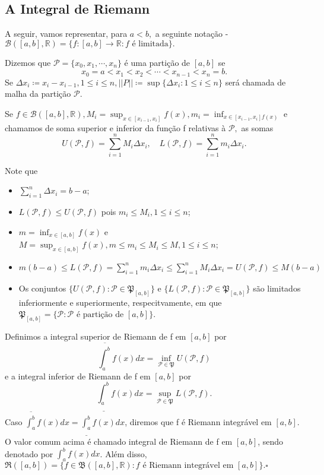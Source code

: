 \documentclass[Analysis/analysis_notes.tex]{subfiles}
\begin{document}
\subsection{A Integral de Riemann}
A seguir, vamos representar, para \(a < b,\) a seguinte nota\c cão - \(\mathcal{B}([a,b], \mathbb{R})=\{f:[a,b]\rightarrow \mathbb{R}: f\text{ é limitada}\}.\)
\begin{def*}
  Dizemos que \(\mathcal{P}=\{x_{0}, x_{1}, \cdots, x_{n}\}\) é uma parti\c cão de \([a, b]\) se 
    \[
      x_{0} = a < x_{1} < x_{2} < \cdots < x_{n-1} < x_{n} = b.
    \]
    Se \(\Delta x_{i}\coloneqq x_{i} - x_{i-1}, 1\leq i\leq n, ||P||\coloneqq \sup\{\Delta x_{i}: 1\leq i\leq n\}\) será chamada de
    malha da parti\c cão \(\mathcal{P}.\)

    Se \(f\in \mathcal{B}([a, b], \mathbb{R}), M_{i}=\sup_{x\in[x_{i-1},x_{i}]}f(x), m_{i}=\inf_{x\in[x_{i-1}, x_{i}]f(x)}\) e
    chamamos de soma superior e inferior da fun\c cão f relativas à \(\mathcal{P},\) as somas 
      \[
        U(\mathcal{P}, f) = \sum\limits_{i=1}^{n}M_{i}\Delta x_{i},\quad L(\mathcal{P}, f)=\sum\limits_{i=1}^{n}m_{i}\Delta x_{i}.
      \]
\end{def*}
  Note que 
 \begin{itemize}
   \item \(\sum\limits_{i=1}^{n}\Delta x_{i} = b-a\);
   \item \(L(\mathcal{P}, f)\leq U(\mathcal{P}, f)\) pois \(m_{i}\leq M_{i}, 1\leq i\leq n\);
   \item \(m=\inf_{x\in[a, b]}f(x)\) e \(M=\sup_{x\in[a, b]}f(x), m\leq m_{i}\leq M_{i}\leq M, 1\leq i\leq n\);
   \item \(m(b-a)\leq L(\mathcal{P}, f) = \sum\limits_{i=1}^{n}m_{i}\Delta x_{i}\leq \sum\limits_{i=1}^{n} M_{i}\Delta x_{i}=U(\mathcal{P}, f)\leq M(b-a)\)
   \item Os conjuntos \(\{U(\mathcal{P}, f): \mathcal{P}\in \mathfrak{P}_{[a, b]}\}\) e
     \(\{L(\mathcal{P}, f): \mathcal{P}\in \mathfrak{P}_{[a, b]}\}\) são limitados inferiormente e superiormente, respecitvamente,
     em que \(\mathfrak{P}_{[a, b]} = \{\mathcal{P}: \mathcal{P}\text{ é parti\c cão de }[a, b]\}\).
 \end{itemize}
\begin{def*}
  Definimos a integral superior de Riemann de f em \([a, b]\) por 
    \[
      \overline{\int_{a}^{b}}f(x)dx = \inf_{\mathcal{P}\in \mathfrak{P}}U(\mathcal{P}, f)
    \]
  e a integral inferior de Riemann de f em \([a, b]\) por 
    \[
      \underline{\int_{a}^{b}}f(x)dx = \sup_{\mathcal{P}\in \mathfrak{P}}L(\mathcal{P}, f).
    \]
  Caso \(\overline{\int_{a}^{b}}f(x)dx = \underline{\int_{a}^{b}}f(x)dx\), diremos que f é Riemann
  integrável em \([a, b]\). O valor comum acima é chamado integral de Riemann de f em
  \([a, b]\), sendo denotado por \(\int_{a}^{b}f(x)dx\). Além disso,
  \(\mathfrak{R}([a, b]) = \{f\in \mathfrak{B}([a, b], \mathbb{R}): f\text{ é Riemann integrável em }[a, b]\}.\square\)
\end{def*}
\end{document}
